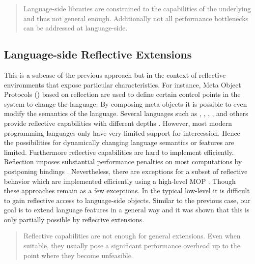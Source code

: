 \begin{quote}
Language-side libraries are constrained to the capabilities of the underlying \VM and thus not general enough. 
Additionally not all performance bottlenecks can be addressed at language-side.
\end{quote}

\subsection{Language-side Reflective Extensions}

This is a subcase of the previous approach but in the context of reflective environments that expose particular characteristics.
For instance, Meta Object Protocols (\MOP) \cite{Kicz91a} based on reflection \cite{Maes87a} are used to define certain control points in the system to change the language.
By composing meta objects it is possible to even modify the semantics of the language. 
Several languages such as \PH, \ST, , , and others provide reflective capabilities with different depths \cite{Ande98a,Van10a}.
However, most modern programming languages only have very limited support for intercession.
Hence the possibilities for dynamically changing language semantics or features are limited. 
Furthermore reflective capabilities are hard to implement efficiently.
Reflection imposes substantial performance penalties on most computations by postponing bindings \cite{Male96a}. 
Nevertheless, there are exceptions for a subset of reflective behavior which are implemented efficiently using a high-level MOP \cite{Vran12a}.
Though these approaches remain as a few exceptions.
In the typical low-level \VM it is difficult to gain reflective access to language-side objects.
Similar to the previous case, our goal is to extend language features in a general way and it was shown that this is only partially possible by reflective extensions. 

\begin{quote}
Reflective capabilities are not enough for general extensions. Even when suitable, they usually pose a significant performance overhead up to the point where they become unfeasible.
\end{quote}

